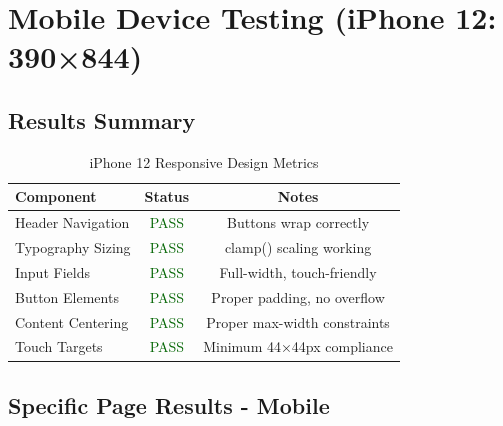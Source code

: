\documentclass[11pt, a4paper]{report}
\begin{document}
\section{Mobile Device Testing (iPhone 12: 390×844)}

\subsection{Results Summary}

\begin{table}[H]
    \centering
    \caption{iPhone 12 Responsive Design Metrics}
    \begin{tabular}{|l|c|c|}
        \hline
        \textbf{Component} & \textbf{Status} & \textbf{Notes} \\
        \hline
        Header Navigation & \textcolor{darkgreen}{PASS} & Buttons wrap correctly \\
        Typography Sizing & \textcolor{darkgreen}{PASS} & clamp() scaling working \\
        Input Fields & \textcolor{darkgreen}{PASS} & Full-width, touch-friendly \\
        Button Elements & \textcolor{darkgreen}{PASS} & Proper padding, no overflow \\
        Content Centering & \textcolor{darkgreen}{PASS} & Proper max-width constraints \\
        Touch Targets & \textcolor{darkgreen}{PASS} & Minimum 44×44px compliance \\
        \hline
    \end{tabular}
\end{table}

\subsection{Specific Page Results - Mobile}
\end{document}

